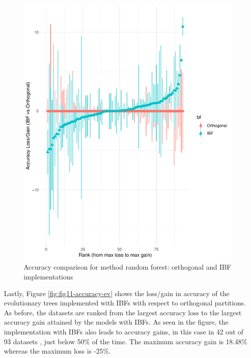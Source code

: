 \documentclass[]{elsarticle} %
\makeatletter
\def\maxwidth{\ifdim\Gin@nat@width>\linewidth\linewidth
\else\Gin@nat@width\fi}
\let\Oldincludegraphics\includegraphics
\renewcommand{\includegraphics}[1]{\Oldincludegraphics[width=\maxwidth]{#1}}
\makeatother
\begin{document}
\begin{figure}
\centering
\includegraphics{Trees_with_Base_Functions_v3_files/figure-latex/fig10-accuracy-forest-1.pdf}
\caption{\label{fig:fig10-accuracy-forest}Accuracy comparison for method
random forest: orthogonal and IBF implementations}
\end{figure}

Lastly, Figure \ref{fig:fig11-accuracy-ev} shows the loss/gain in
accuracy of the evolutionary trees implemented with IBFs with respect to
orthogonal partitions. As before, the datasets are ranked from the
largest accuracy loss to the largest accuracy gain attained by the
models with IBFs. As seen in the figure, the implementation with IBFs
also leads to accuracy gains, in this case in 42 out of 93 datasets ,
just below 50\% of the time. The maximum accuracy gain is 18.48\%
whereas the maximum loss is -25\%.
\end{document}

